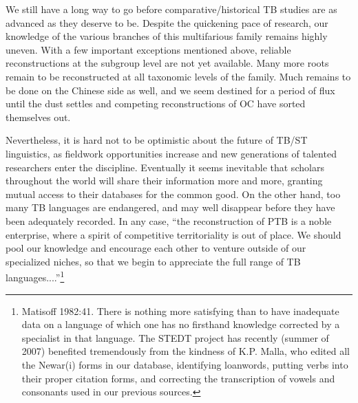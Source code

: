 We still have a long way to go before comparative/historical TB studies are
as advanced as they deserve to be.  Despite the quickening pace of research, our
knowledge of the various branches of this multifarious family remains highly
uneven. With a few important exceptions mentioned above, reliable
reconstructions at the subgroup level are not yet available.  Many more roots
remain to be reconstructed at all taxonomic levels of the family. Much remains
to be done on the Chinese side as well, and we seem destined for a period of
flux until the dust settles and competing reconstructions of OC have sorted
themselves out.


Nevertheless, it is hard not to be optimistic about the future of TB/ST
linguistics, as fieldwork opportunities increase and new generations of talented
researchers enter the discipline. Eventually it seems inevitable that scholars
throughout the world will share their information more and more, granting mutual
access to their databases for the common good. On the other hand, too many TB
languages are endangered, and may well disappear before they have been
adequately recorded. In any case, “the reconstruction of PTB is a noble
enterprise, where a spirit of competitive territoriality is out of place. We
should pool our knowledge and encourage each other to venture outside of our
specialized niches, so that we begin to appreciate the full range of TB
languages....”\footnote{Matisoff 1982:41.  There is nothing more satisfying
than to have inadequate data on a language of which one has no firsthand
knowledge corrected by a specialist in that language.  The STEDT project
has recently (summer of 2007) benefited tremendously from the kindness of K.P.
Malla, who edited all the Newar(i) forms in our database, identifying loanwords,
putting verbs into their proper citation forms, and correcting the transcription
of vowels and consonants used in our previous sources.}



